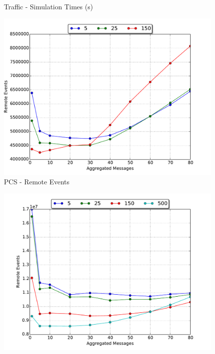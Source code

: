 \documentclass[11pt]{book}
\begin{document}
\begin{figure}
\begin{minipage}{.5\textwidth}
\begin{center}
      Traffic - Simulation Times (s) \\
    \end{center}
  \end{minipage}
  \begin{minipage}{.5\textwidth}
    \begin{center}
      \includegraphics[width=\textwidth,keepaspectratio,quiet]{figs/partitioning_communication/aggregate_pcs_remote.pdf} \\
      PCS - Remote Events \\
    \end{center}
  \end{minipage}%
  \hfill
  \begin{minipage}{.5\textwidth}
    \begin{center}
      \includegraphics[width=\textwidth,keepaspectratio,quiet]{figs/partitioning_communication/aggregate_traffic_remote.pdf} \\

\end{center}
\end{minipage}
\end{figure}
\end{document}
